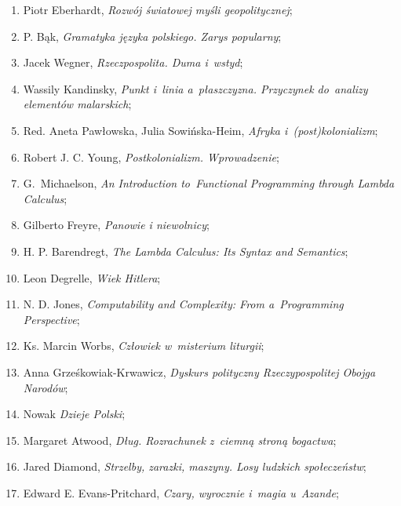 \documentclass[a4paper,11pt]{article}
\begin{document}
\begin{enumerate}
\item Piotr Eberhardt, \textit{Rozwój światowej myśli geopolitycznej};

\item P. Bąk, \textit{Gramatyka języka polskiego. Zarys popularny};

\item Jacek Wegner, \textit{Rzeczpospolita. Duma i~wstyd};

\item Wassily Kandinsky, \textit{Punkt i~linia a~płaszczyzna. Przyczynek
    do~analizy elementów malarskich};

\item Red. Aneta Pawłowska, Julia Sowińska-Heim, \textit{Afryka
    i~(post)kolonializm};

\item Robert J. C. Young, \textit{Postkolonializm. Wprowadzenie};

\item G.~Michaelson, \textit{An Introduction to~Functional Programming
    through Lambda Calculus};

\item Gilberto Freyre, \textit{Panowie i niewolnicy};

\item H. P. Barendregt, \textit{The Lambda Calculus: Its Syntax and
    Semantics};

\item Leon Degrelle, \textit{Wiek Hitlera};

\item N. D. Jones, \textit{Computability and Complexity: From
    a~Programming Perspective};

\item Ks. Marcin Worbs, \textit{Człowiek w~misterium liturgii};

\item Anna Grześkowiak-Krwawicz, \textit{Dyskurs polityczny
    Rzeczypospolitej Obojga Narodów};

\item Nowak \textit{Dzieje Polski};

\item Margaret Atwood, \textit{Dług. Rozrachunek z~ciemną stroną
    bogactwa};

\item Jared Diamond, \textit{Strzelby, zarazki, maszyny. Losy ludzkich
    społeczeństw};

\item Edward E. Evans-Pritchard, \textit{Czary, wyrocznie i~magia
    u~Azande};


\end{enumerate}
\end{document}
